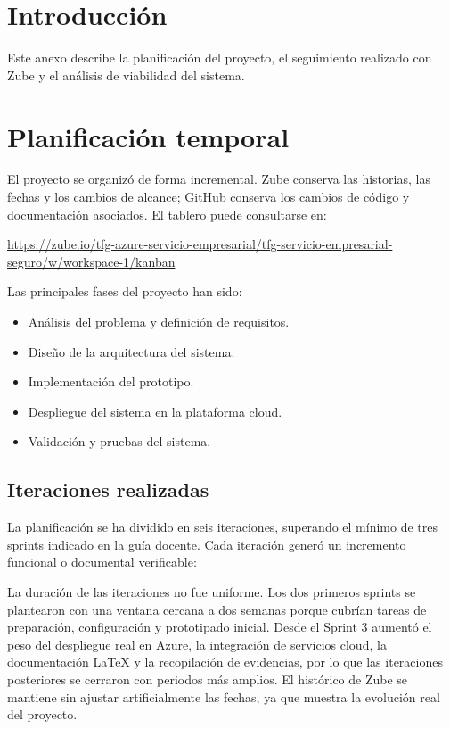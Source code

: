 
\section{Introducción}

Este anexo describe la planificación del proyecto, el seguimiento realizado con Zube y el análisis de viabilidad del sistema.

\section{Planificación temporal}

El proyecto se organizó de forma incremental. Zube conserva las historias, las fechas y los cambios de alcance; GitHub conserva los cambios de código y documentación asociados. El tablero puede consultarse en:

\begin{center}
\url{https://zube.io/tfg-azure-servicio-empresarial/tfg-servicio-empresarial-seguro/w/workspace-1/kanban}
\end{center}

Las principales fases del proyecto han sido:

\begin{itemize}

\item Análisis del problema y definición de requisitos.

\item Diseño de la arquitectura del sistema.

\item Implementación del prototipo.

\item Despliegue del sistema en la plataforma cloud.

\item Validación y pruebas del sistema.

\end{itemize}

\subsection{Iteraciones realizadas}

La planificación se ha dividido en seis iteraciones, superando el mínimo de tres sprints indicado en la guía docente. Cada iteración generó un incremento funcional o documental verificable:

La duración de las iteraciones no fue uniforme. Los dos primeros sprints se plantearon con una ventana cercana a dos semanas porque cubrían tareas de preparación, configuración y prototipado inicial. Desde el Sprint 3 aumentó el peso del despliegue real en Azure, la integración de servicios cloud, la documentación LaTeX y la recopilación de evidencias, por lo que las iteraciones posteriores se cerraron con periodos más amplios. El histórico de Zube se mantiene sin ajustar artificialmente las fechas, ya que muestra la evolución real del proyecto.

